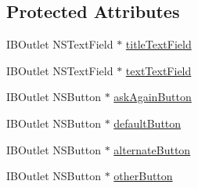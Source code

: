 \subsection*{Protected Attributes}
\begin{DoxyCompactItemize}
\item 
I\-B\-Outlet N\-S\-Text\-Field $\ast$ \hyperlink{interface_confirmation_sheet_controller_ac5c94ad3b2ce0b041659a382a4ebbf7b}{title\-Text\-Field}
\item 
I\-B\-Outlet N\-S\-Text\-Field $\ast$ \hyperlink{interface_confirmation_sheet_controller_a4d426337207c2de434679201b283dbba}{text\-Text\-Field}
\item 
I\-B\-Outlet N\-S\-Button $\ast$ \hyperlink{interface_confirmation_sheet_controller_aca88509267ea6dffabe5cdd20c6d0c46}{ask\-Again\-Button}
\item 
I\-B\-Outlet N\-S\-Button $\ast$ \hyperlink{interface_confirmation_sheet_controller_a1f7cdca8c07525dad680249f16567787}{default\-Button}
\item 
I\-B\-Outlet N\-S\-Button $\ast$ \hyperlink{interface_confirmation_sheet_controller_ac5ee34067e73403580d94a8208d0ebbb}{alternate\-Button}
\item 
I\-B\-Outlet N\-S\-Button $\ast$ \hyperlink{interface_confirmation_sheet_controller_a27baa098bba9010a532f6bc6b16d4371}{other\-Button}
\end{DoxyCompactItemize}
